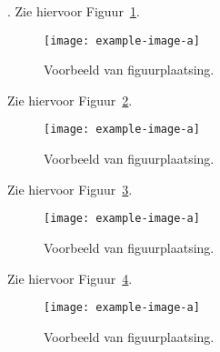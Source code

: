 \documentclass{article}
\begin{document}
    \lipsum[1-1].
    Zie hiervoor Figuur~\ref{fig:exampleFigurePlacement}.

    \begin{figure}[h]
        \centering
        \texttt{[image: example-image-a]}
        \caption{Voorbeeld van figuurplaatsing.}
        \label{fig:exampleFigurePlacement}
    \end{figure}

    \lipsum[2-2]

    \newpage

    \lipsum[1-1]

    Zie hiervoor Figuur~\ref{fig:exampleFigurePlacement2}.

    \begin{figure}[t]
        \centering
        \texttt{[image: example-image-a]}
        \caption{Voorbeeld van figuurplaatsing.}
        \label{fig:exampleFigurePlacement2}
    \end{figure}

    \lipsum[2-2]

    \newpage

    \lipsum[1-1]

    Zie hiervoor Figuur~\ref{fig:exampleFigurePlacement3}.

    \begin{figure}[b]
        \centering
        \texttt{[image: example-image-a]}
        \caption{Voorbeeld van figuurplaatsing.}
        \label{fig:exampleFigurePlacement3}
    \end{figure}

    \lipsum[2-2]

    \newpage

    \lipsum[1-1]

    Zie hiervoor Figuur~\ref{fig:exampleFigurePlacement4}.

    \begin{figure}[p]
        \centering
        \texttt{[image: example-image-a]}
        \caption{Voorbeeld van figuurplaatsing.}
        \label{fig:exampleFigurePlacement4}
    \end{figure}

    \lipsum[2-2]
\end{document}
